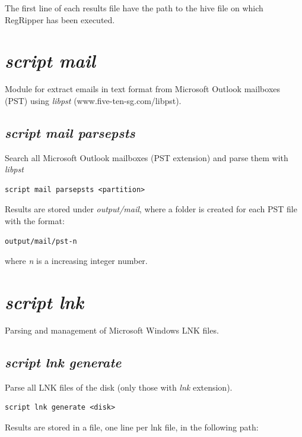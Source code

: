 \documentclass[a4paper,11pt,oneside]{report}
\begin{document}
The first line of each results file have the path to the hive file on which RegRipper has been executed. 





\section{\emph{script mail}}

Module for extract emails in text format from Microsoft Outlook mailboxes (PST) using \emph{libpst} (www.five-ten-sg.com/libpst).

\subsection{\emph{script mail parsepsts}}

Search all Microsoft Outlook mailboxes (PST extension) and parse them with \emph{libpst}

\begin{verbatim}
script mail parsepsts <partition>
\end{verbatim}

Results are stored under \emph{output/mail}, where a folder is created for each PST file with the format:

\begin{verbatim}
output/mail/pst-n
\end{verbatim}

where \emph{n} is a increasing integer number.






\section{\emph{script lnk}}


Parsing and management of Microsoft Windows LNK files.

\subsection{\emph{script lnk generate}} 

Parse all LNK files of the disk (only those with \emph{lnk} extension).

\begin{verbatim}
script lnk generate <disk>
\end{verbatim}

Results are stored in a file, one line per lnk file, in the following path:
\end{document}
